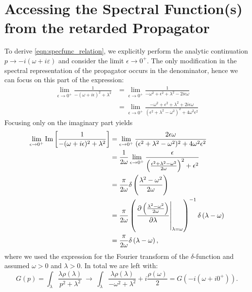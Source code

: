 \section*{Accessing the Spectral Function(s) from the retarded Propagator}
To derive \eqref{eqn:specfunc_relation}, we explicitly perform the analytic continuation $p\rightarrow -i\left(\omega + i\varepsilon\right)$ and consider the limit $\epsilon\rightarrow 0^+$. The only modification in the spectral representation of the propagator occurs in the denominator, hence we can focus on this part of the expression: 
\begin{equation}
	\begin{aligned}
		\lim\limits_{\epsilon\rightarrow 0^+} \frac{1}{-(\omega + i\epsilon)^2 + \lambda^2} &= 	\lim\limits_{\epsilon\rightarrow 0^+} \frac{1}{-\omega^2 + \epsilon^2 + \lambda^2 - 2i\epsilon\omega} \\
		&= 	\lim\limits_{\epsilon\rightarrow 0^+} \frac{-\omega^2 + \epsilon^2 + \lambda^2 + 2i\epsilon\omega}{(\epsilon^2 + \lambda^2 - \omega^2)^2 + 4\omega^2\epsilon^2}
	\end{aligned}
\end{equation}
Focusing only on the imaginary part yields
\begin{equation}
	\begin{aligned}
		 \lim\limits_{\epsilon\rightarrow 0^+}  \Im\left[\frac{1}{-(\omega + i\epsilon)^2 + \lambda^2}\right] &= \lim\limits_{\epsilon\rightarrow 0^+}  \frac{2\epsilon\omega}{(\epsilon^2 + \lambda^2 - \omega^2)^2 + 4\omega^2\epsilon^2} \\
		&= \frac{1}{2\omega}  \lim\limits_{\epsilon\rightarrow 0^+} \frac{\epsilon}{\left(\frac{\epsilon^2 + \lambda^2 - \omega^2}{2\omega}\right)^2 + \epsilon^2}\\
		&= \frac{\pi}{2\omega}\delta\left(\frac{\lambda^2-\omega^2}{2\omega}\right) \\
		&= \frac{\pi}{2\omega}\left(\eval{\frac{\partial\left(\frac{\lambda^2-\omega^2}{2\omega}\right)}{\partial\lambda}}_{\lambda=\omega}\right)^{-1}\delta\left(\lambda-\omega\right)\\
		&= \frac{\pi}{2\omega}\delta\left(\lambda-\omega\right),
	\end{aligned}
\end{equation}
where we used the expression for the Fourier transform of the $\delta$-function and assumed $\omega > 0$ and $\lambda > 0$. In total we are left with:
\begin{equation}
	G(p) = \int_\lambda\frac{\lambda\rho(\lambda)}{p^2 + \lambda^2}\ \longrightarrow\ \int_\lambda\frac{\lambda\rho(\lambda)}{-\omega^2 + \lambda^2} + i\frac{\rho(\omega)}{2} = G\left(-i(\omega + i0^+)\right).
\end{equation}
